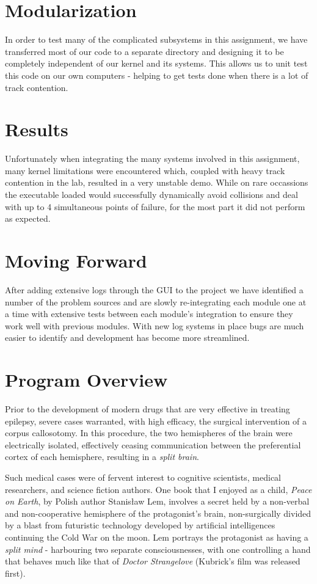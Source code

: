\documentclass{amsart} \usepackage{amsmath} \usepackage{upgreek}
\begin{document}
\section*{Modularization}

In order to test many of the complicated subsystems in this assignment, we have
transferred most of our code to a separate directory and designing it to be
completely independent of our kernel and its systems. This allows us to unit
test this code on our own computers - helping to get tests done when there is a
lot of track contention.

\section*{Results}

Unfortunately when integrating the many systems involved in this assignment,
many kernel limitations were encountered which, coupled with heavy track
contention in the lab, resulted in a very unstable demo. While on rare
occassions the executable loaded would successfully dynamically avoid collisions
and deal with up to 4 simultaneous points of failure, for the most part it did
not perform as expected.

\section*{Moving Forward}

After adding extensive logs through the GUI to the project we have identified a
number of the problem sources and are slowly re-integrating each module one at a
time with extensive tests between each module's integration to ensure they work
well with previous modules. With new log systems in place bugs are much easier
to identify and development has become more streamlined.

\section*{Program Overview}

Prior to the development of modern drugs that are very effective in treating
epilepsy, severe cases warranted, with high efficacy, the surgical intervention
of a corpus callosotomy. In this procedure, the two hemispheres of the brain
were electrically isolated, effectively ceasing communication between the
preferential cortex of each hemisphere, resulting in a \textit{split brain}.

Such medical cases were of fervent interest to cognitive scientists, medical
researchers, and science fiction authors. One book that I enjoyed as a child,
\textit{Peace on Earth}, by Polish author Stanis\l{}aw Lem, involves a secret
held by a non-verbal and non-cooperative hemisphere of the protagonist's brain,
non-surgically divided by a blast from futuristic technology developed by
artificial intelligences continuing the Cold War on the moon. Lem portrays the
protagonist as having a \textit{split mind} - harbouring two separate
consciousnesses, with one controlling a hand that behaves much like that of
\textit{Doctor Strangelove} (Kubrick's film was released first).
\end{document}
